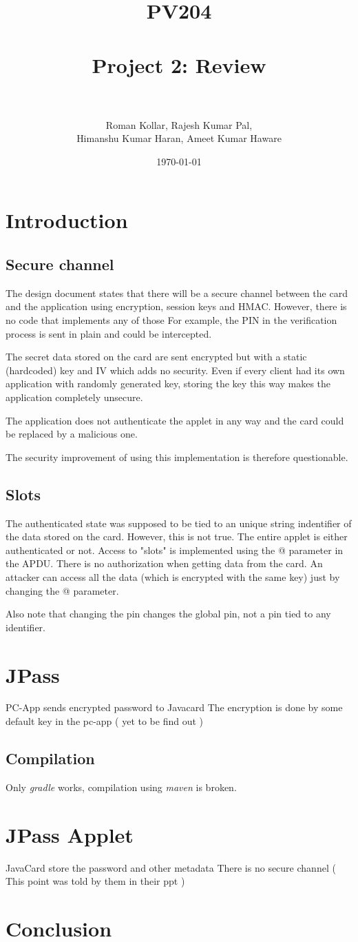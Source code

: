 \documentclass[paper=a4, fontsize=12pt]{scrartcl}
\title{
\normalfont \normalsize
\textsc{PV204} \\ [25pt]
\horrule{0.5pt} \\[0.4cm]
\huge Project 2: Review  \\
\horrule{2pt} \\[0.5cm]
}
\author{Roman Kollar, Rajesh Kumar Pal,\\Himanshu Kumar Haran, Ameet Kumar Haware}
\date{\normalsize\today}
\begin{document}
\maketitle

\section{Introduction}
\subsection{Secure channel}
The design document states that there will be a secure channel between the card and the application using encryption, session keys and HMAC.
However, there is no code that implements any of those
For example, the PIN in the verification process is sent in plain and could be intercepted.

The secret data stored on the card are sent encrypted but with a static (hardcoded) key and IV which adds no security.
Even if every client had its own application with randomly generated key, storing the key this way makes the application completely unsecure.

The application does not authenticate the applet in any way and the card could be replaced by a malicious one.

The security improvement of using this implementation is therefore questionable.

\subsection{Slots}
The authenticated state was supposed to be tied to an unique string indentifier of the data stored on the card.
However, this is not true.
The entire applet is either authenticated or not.
Access to "slots" is implemented using the @ parameter in the APDU.
There is no authorization when getting data from the card.
An attacker can access all the data (which is encrypted with the same key) just by changing the @ parameter.

Also note that changing the pin changes the global pin, not a pin tied to any identifier.

\section{JPass}
PC-App sends encrypted password to Javacard
The encryption is done by some default key in the pc-app ( yet to be find out )
\subsection{Compilation}
Only \emph{gradle} works, compilation using \emph{maven} is broken.

\section{JPass Applet}
JavaCard store the password and other metadata
There is no secure channel ( This point was told by them in their ppt )

\section{Conclusion}
\end{document}
